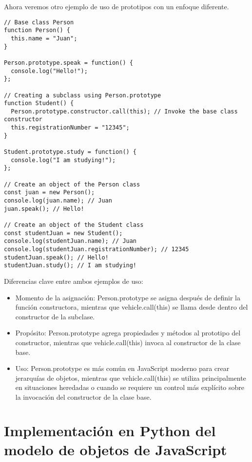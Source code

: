 \documentclass{article}
\begin{document}
Ahora veremos otro ejemplo de uso de prototipos con un enfoque diferente.
\begin{lstlisting}
// Base class Person
function Person() {
  this.name = "Juan";
}

Person.prototype.speak = function() {
  console.log("Hello!");
};

// Creating a subclass using Person.prototype
function Student() {
  Person.prototype.constructor.call(this); // Invoke the base class constructor
  this.registrationNumber = "12345";
}

Student.prototype.study = function() {
  console.log("I am studying!");
};

// Create an object of the Person class
const juan = new Person();
console.log(juan.name); // Juan
juan.speak(); // Hello!

// Create an object of the Student class
const studentJuan = new Student();
console.log(studentJuan.name); // Juan
console.log(studentJuan.registrationNumber); // 12345
studentJuan.speak(); // Hello!
studentJuan.study(); // I am studying!

\end{lstlisting}

Diferencias clave entre ambos ejemplos de uso:
\begin{itemize}
      \item Momento de la asignación: Person.prototype se asigna después de definir la función constructora, mientras que vehicle.call(this) se llama desde dentro del constructor de la subclase.
      \item Propósito: Person.prototype agrega propiedades y métodos al prototipo del constructor, mientras que vehicle.call(this) invoca al constructor de la clase base.
      \item Uso: Person.prototype es más común en JavaScript moderno para crear jerarquías de objetos, mientras que vehicle.call(this) se utiliza principalmente en situaciones heredadas o cuando se requiere un control más explícito sobre la invocación del constructor de la clase base.

\end{itemize}

\section{Implementación en Python del modelo de objetos de JavaScript}
\end{document}
